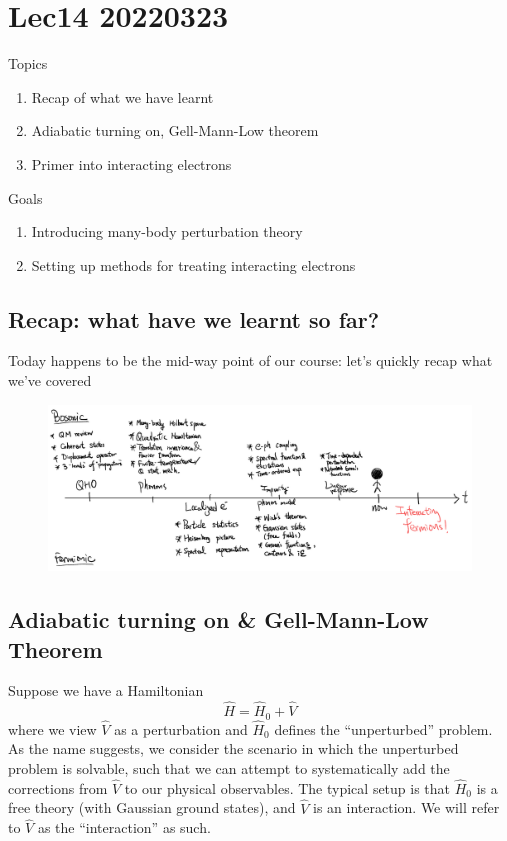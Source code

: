 \chapter{Lec14 20220323}

Topics

\begin{enumerate}
    \item Recap of what we have learnt
    \item Adiabatic turning on, Gell-Mann-Low theorem
    \item Primer into interacting electrons
\end{enumerate}

Goals

\begin{enumerate}
    \item Introducing many-body perturbation theory
    \item Setting up methods for treating interacting electrons
\end{enumerate}

\section{Recap: what have we learnt so far?}

Today happens to be the mid-way point of our course: let's quickly recap what we've covered

\begin{figure}[ht]
    \centering
    \includegraphics[width=\textwidth]{jupyterbook/data/fig/lec14-fig00.png}
\end{figure}

\section{Adiabatic turning on \& Gell-Mann-Low Theorem}

Suppose we have a Hamiltonian
\[ \hat{H}=\hat{H}_0+\hat{V}\]
where we view $\hat{V}$ as a perturbation and $\hat{H}_0$ defines the ``unperturbed'' problem. As the name suggests, we consider the scenario in which the unperturbed problem is solvable, such that we can attempt to systematically add the corrections from $\hat{V}$ to our physical observables. The typical setup is that $\hat{H}_0$ is a free theory (with Gaussian ground states), and $\hat{V}$ is an interaction. We will refer to $\hat{V}$ as the ``interaction'' as such.

